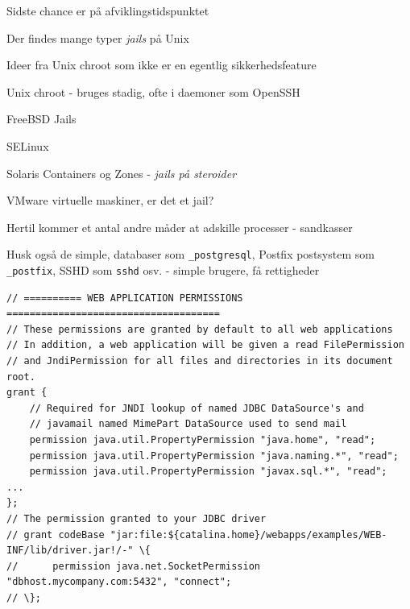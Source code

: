 \documentclass[Screen16to9,17pt]{foils}
\begin{document}


\centerline{Sidste chance er på afviklingstidspunktet}




\begin{list1}
\item Der findes mange typer \emph{jails} på Unix
\item Ideer fra Unix chroot som ikke er en egentlig sikkerhedsfeature
\begin{list2}
\item Unix chroot - bruges stadig, ofte i daemoner som OpenSSH
\item FreeBSD Jails
\item SELinux
\item Solaris Containers og Zones - \emph{jails på steroider}
\item VMware virtuelle maskiner, er det et jail?
\end{list2}
\item Hertil kommer et antal andre måder at adskille processer - sandkasser
\item Husk også de simple, databaser som \verb+_postgresql+, Postfix postsystem som \verb+_postfix+, SSHD som \verb+sshd+ osv. - simple brugere, få rettigheder
\end{list1}


\begin{verbatim}
// ========== WEB APPLICATION PERMISSIONS =====================================
// These permissions are granted by default to all web applications
// In addition, a web application will be given a read FilePermission
// and JndiPermission for all files and directories in its document root.
grant {
    // Required for JNDI lookup of named JDBC DataSource's and
    // javamail named MimePart DataSource used to send mail
    permission java.util.PropertyPermission "java.home", "read";
    permission java.util.PropertyPermission "java.naming.*", "read";
    permission java.util.PropertyPermission "javax.sql.*", "read";
...
};
// The permission granted to your JDBC driver
// grant codeBase "jar:file:${catalina.home}/webapps/examples/WEB-INF/lib/driver.jar!/-" \{
//      permission java.net.SocketPermission "dbhost.mycompany.com:5432", "connect";
// \};
\end{verbatim}
\end{document}
